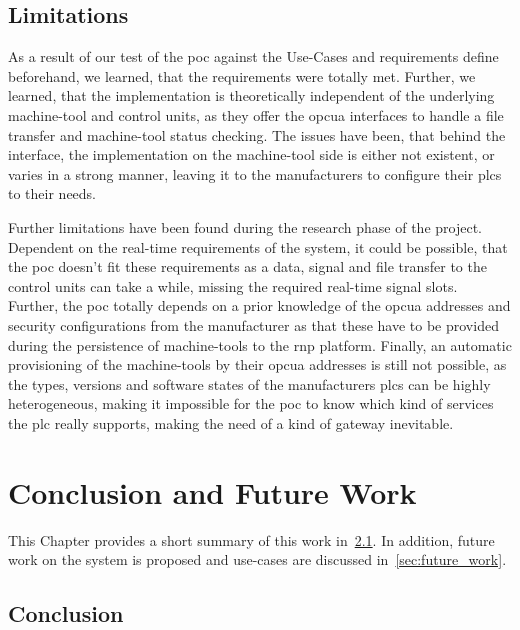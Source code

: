 \documentclass[
a4paper,
twoside,
headsepline,
cleardoublepage=empty,
parskip=half,
draft=false
]{scrbook}
\begin{document}
		\section{Limitations}\label{sec:limitations}

			As a result of our test of the \gls{poc} against the Use-Cases and requirements define beforehand, we learned, that the requirements were totally met. Further, we learned, that the implementation is theoretically independent of the underlying machine-tool and control units, as they offer the \gls{opcua} interfaces to handle a file transfer and machine-tool status checking. The issues have been, that behind the interface, the implementation on the machine-tool side is either not existent, or varies in a strong manner, leaving it to the manufacturers to configure their \gls{plc}s to their needs.

			Further limitations have been found during the research phase of the project. Dependent on the real-time requirements of the system, it could be possible, that the \gls{poc} doesn't fit these requirements as a data, signal and file transfer to the control units can take a while, missing the required real-time signal slots. Further, the \gls{poc} totally depends on a prior knowledge of the \gls{opcua} addresses and security configurations from the manufacturer as that these have to be provided during the persistence of machine-tools to the \gls{rnp} platform. Finally, an automatic provisioning of the machine-tools by their \gls{opcua} addresses is still not possible, as the types, versions and software states of the manufacturers \gls{plc}s can be highly heterogeneous, making it impossible for the \gls{poc} to know which kind of services the \gls{plc} really supports, making the need of a kind of gateway inevitable.

	\chapter{Conclusion and Future Work} \label{ch:conclusion_and_future_work}

		This Chapter provides a short summary of this work in~\cref{sec:conclusion}. In addition, future work on the system is proposed and use-cases are discussed in~\cref{sec:future_work}.

		\section{Conclusion}\label{sec:conclusion}
\end{document}
